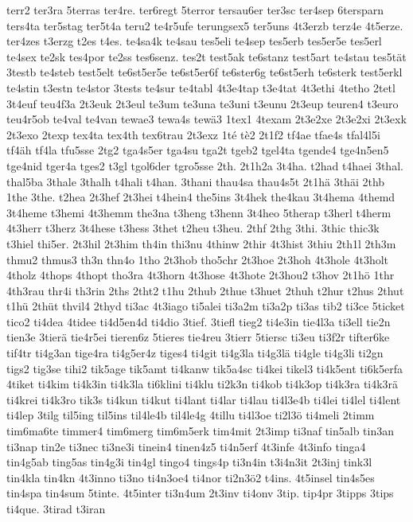 {terr2
ter3ra
5terras
ter4re.
ter6regt
5terror
tersau6er
ter3sc
ter4sep
6tersparn
ters4ta
ter5stag
ter5t4a
teru2
te4r5ufe
terungsex5
ter5uns
4t3erzb
terz4e
4t5erze.
ter4zes
t3erzg
t2es
t4es.
te4sa4k
te4sau
tes5eli
te4sep
tes5erb
tes5er5e
tes5erl
te4sex
te2sk
tes4por
te2ss
tes6senz.
tes2t
test5ak
te6stanz
test5art
te4stau
tes5tät
3testb
te4steb
test5elt
te6st5er5e
te6st5er6f
te6ster6g
te6st5erh
te6sterk
test5erkl
te4stin
t3estn
te4stor
3tests
te4sur
te4tabl
4t3e4tap
t3e4tat
4t3ethi
4tetho
2tetl
3t4euf
teu4f3a
2t3euk
2t3eul
te3um
te3una
te3uni
t3eunu
2t3eup
teuren4
t3euro
teu4r5ob
te4val
te4van
tewae3
tewa4s
tewä3
1tex1
4texam
2t3e2xe
2t3e2xi
2t3exk
2t3exo
2texp
tex4ta
tex4th
tex6trau
2t3exz
1té
tè2
2t1f2
tf4ae
tfae4s
tfal4l5i
tf4äh
tf4la
tfu5sse
2tg2
tga4s5er
tga4su
tga2t
tgeb2
tgel4ta
tgende4
tge4n5en5
tge4nid
tger4a
tges2
t3gl
tgol6der
tgro5sse
2th.
2t1h2a
3t4ha.
t2had
t4haei
3thal.
thal5ba
3thale
3thalh
t4hali
t4han.
3thani
thau4sa
thau4s5t
2t1hä
3thäi
2thb
1the
3the.
t2hea
2t3hef
2t3hei
t4hein4
the5ins
3t4hek
the4kau
3t4hema
4themd
3t4heme
t3hemi
4t3hemm
the3na
t3heng
t3henn
3t4heo
5therap
t3herl
t4herm
4t3herr
t3herz
3t4hese
t3hess
3thet
t2heu
t3heu.
2thf
2thg
3thi.
3thic
thic3k
t3hiel
thi5er.
2t3hil
2t3him
th4in
thi3nu
4thinw
2thir
4t3hist
3thiu
2th1l
2th3m
thmu2
thmus3
th3n
thn4o
1tho
2t3hob
tho5chr
2t3hoe
2t3hoh
4t3hole
4t3holt
4tholz
4thops
4thopt
tho3ra
4t3horn
4t3hose
4t3hote
2t3hou2
t3hov
2t1hö
1thr
4th3rau
thr4i
th3rin
2ths
2tht2
t1hu
2thub
2thue
t3huet
2thuh
t2hur
t2hus
2thut
t1hü
2thüt
thvil4
2thyd
ti3ac
4t3iago
ti5alei
ti3a2m
ti3a2p
ti3as
tib2
ti3ce
5ticket
tico2
ti4dea
4tidee
ti4d5en4d
ti4dio
3tief.
3tiefl
tieg2
ti4e3in
tie4l3a
ti3ell
tie2n
tien3e
3tierä
tie4r5ei
tieren6z
5tieres
tie4reu
3tierr
5tiersc
ti3eu
ti3f2r
tifter6ke
tif4tr
ti4g3an
tige4ra
ti4g5er4z
tiges4
ti4git
ti4g3la
ti4g3lä
ti4gle
ti4g3li
ti2gn
tigs2
tig3se
tihi2
tik5age
tik5amt
ti4kanw
tik5a4sc
ti4kei
tikel3
ti4k5ent
ti6k5erfa
4tiket
ti4kim
ti4k3in
ti4k3la
ti6klini
ti4klu
ti2k3n
ti4kob
ti4k3op
ti4k3ra
ti4k3rä
ti4krei
ti4k3ro
tik3s
ti4kun
ti4kut
ti4lant
ti4lar
ti4lau
ti4l3e4b
ti4lei
ti4lel
ti4lent
ti4lep
3tilg
til5ing
til5ins
til4le4b
til4le4g
4tillu
ti4l3oe
ti2l3ö
ti4meli
2timm
tim6ma6te
timmer4
tim6merg
tim6m5erk
tim4mit
2t3imp
ti3naf
tin5alb
tin3an
ti3nap
tin2e
ti3nec
ti3ne3i
tinein4
tinen4z5
ti4n5erf
4t3infe
4t3info
tinga4
tin4g5ab
ting5as
tin4g3i
tin4gl
tingo4
tings4p
ti3n4in
t3i4n3it
2t3inj
tink3l
tin4kla
tin4kn
4t3inno
ti3no
ti4n3oe4
ti4nor
ti2n3ö2
t4ins.
4t5insel
tin4s5es
tin4spa
tin4sum
5tinte.
4t5inter
ti3n4um
2t3inv
ti4onv
3tip.
tip4pr
3tipps
3tips
ti4que.
3tirad
t3iran
}
